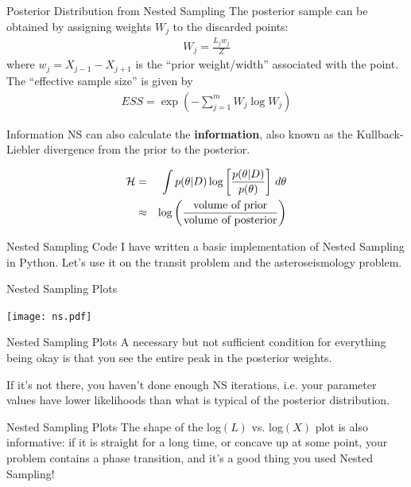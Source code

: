 \begin{frame}[t]{Posterior Distribution from Nested Sampling}
The posterior sample can be obtained by assigning weights $W_j$ to the
discarded points:
\begin{align*}
W_{j} = \frac{L_{j} w_{j}}{Z} 
\end{align*}
where $w_{j}=X_{j-1} - X_{j+1}$ is the ``prior weight/width'' associated with the
point. The ``effective sample size'' is given by
\begin{align*}
ESS = \exp \left( - \sum_{j=1}^{m} W_j \log W_j \right)
\end{align*}

\end{frame}

\begin{frame}[t]{Information}
NS can also calculate the {\bf information}, also known as the Kullback-Liebler
divergence from the prior to the posterior.

\begin{eqnarray*}
\mathcal{H} &=& \int p(\theta | D) \log\left[\frac{p(\theta | D)}{p(\theta)}\right]
\, d\theta\\
&\approx& \log\left(
\frac{\textnormal{volume of prior}}{\textnormal{volume of posterior}}
\right)
\end{eqnarray*}
\end{frame}

\begin{frame}[t]{Nested Sampling Code}
I have written a basic implementation of Nested Sampling in Python. Let's
use it on the transit problem and the asteroseismology problem.

\end{frame}

\begin{frame}[t]{Nested Sampling Plots}
\vspace{-10pt}
\begin{center}
\texttt{[image: ns.pdf]}
\end{center}

\end{frame}

\begin{frame}[t]{Nested Sampling Plots}
A necessary but not sufficient condition for everything being okay is that you
see the entire peak in the posterior weights.\\

\vspace{20pt}

If it's not there, you haven't done enough NS iterations. i.e. your parameter
values have lower likelihoods than what is typical of the posterior distribution.
\end{frame}

\begin{frame}[t]{Nested Sampling Plots}
The shape of the log$(L)$ vs. log$(X)$ plot is also informative: if it is
straight for a long time, or concave up at some point, your problem contains
a phase transition, and it's a good thing you used Nested Sampling!
\end{frame}


